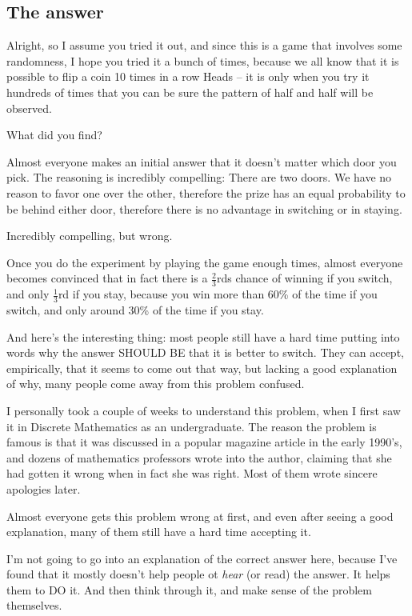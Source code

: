 \subsection{The answer}
Alright, so I assume you tried it out, and since this is a game that
involves some randomness, I hope you tried it a bunch of times,
because we all know that it is possible to flip a coin 10 times in a
row Heads -- it is only when you try it hundreds of times that you can
be sure the pattern of half and half will be observed.

What did you find?

Almost everyone makes an initial answer that it doesn't matter which
door you pick.  The reasoning is incredibly compelling: There are two
doors.  We have no reason to favor one over the other, therefore the
prize has an equal probability to be behind either door, therefore
there is no advantage in switching or in staying.

Incredibly compelling, but wrong.

Once you do the experiment by playing the game enough times, almost
everyone becomes convinced that in fact there is a $\frac{2}{3}$rds
chance of winning if you switch, and only $\frac{1}{3}$rd if you stay,
because you win more than 60\% of the time if you switch, and only
around 30\% of the time if you stay.

And here's the interesting thing: most people still have a hard time
putting into words why the answer SHOULD BE that it is better to
switch.  They can accept, empirically, that it seems to come out that
way, but lacking a good explanation of why, many people come away from
this problem confused.

I personally took a couple of weeks to understand this problem, when I
first saw it in Discrete Mathematics as an undergraduate.  The reason
the problem is famous is that it was discussed in a popular magazine
article in the early 1990's, and dozens of mathematics professors
wrote into the author, claiming that she had gotten it wrong when in
fact she was right.  Most of them wrote sincere apologies later.

Almost everyone gets this problem wrong at first, and even after
seeing a good explanation, many of them still have a hard time
accepting it.

I'm not going to go into an explanation of the correct answer here,
because I've found that it mostly doesn't help people ot \emph{hear}
(or read) the answer.  It helps them to DO it.  And then think through
it, and make sense of the problem themselves.

